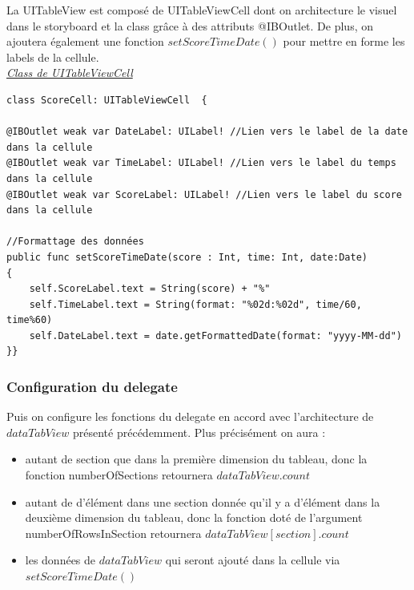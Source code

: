 \documentclass{article}
\begin{document}
La UITableView est composé de UITableViewCell dont on architecture le visuel dans le storyboard et la class grâce à des attributs @IBOutlet. De plus, on ajoutera également une fonction $setScoreTimeDate()$ pour mettre en forme les labels de la cellule.\\


\noindent \underline{\textit{Class de UITableViewCell}}
\begin{verbatim}
class ScoreCell: UITableViewCell  {
    
@IBOutlet weak var DateLabel: UILabel! //Lien vers le label de la date dans la cellule
@IBOutlet weak var TimeLabel: UILabel! //Lien vers le label du temps dans la cellule
@IBOutlet weak var ScoreLabel: UILabel! //Lien vers le label du score dans la cellule

//Formattage des données 
public func setScoreTimeDate(score : Int, time: Int, date:Date)
{
    self.ScoreLabel.text = String(score) + "%"
    self.TimeLabel.text = String(format: "%02d:%02d", time/60, time%60)
    self.DateLabel.text = date.getFormattedDate(format: "yyyy-MM-dd")
}}
\end{verbatim}

\subsubsection{Configuration du delegate}

Puis on configure les fonctions du delegate en accord avec l'architecture de  $dataTabView$ présenté précédemment. Plus précisément on aura : 
\begin{itemize}
    \item  autant de section que dans la première dimension du tableau, donc la fonction numberOfSections retournera $dataTabView.count$
    \item  autant de d'élément dans une section donnée qu'il y a d'élément dans la deuxième dimension du tableau, donc la fonction doté de l'argument numberOfRowsInSection retournera $dataTabView[section].count$
    \item  les données de $dataTabView$ qui seront ajouté dans la cellule via $setScoreTimeDate()$\\
\end{itemize}
\end{document}
